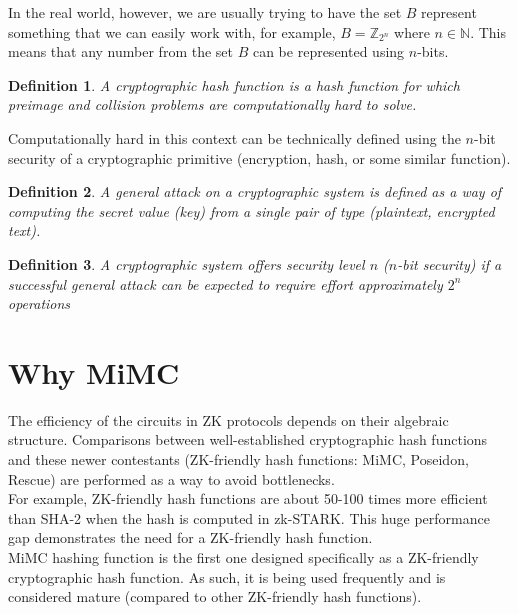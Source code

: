 \documentclass[letterpaper, bothsides, 12pt]{article} %
\newtheorem{definition}{Definition}
\begin{document}
In the real world, however, we are usually trying to have the set $B$ represent something that we can easily work with, for example, $B = \mathbb{Z}_{2^n}$ where $n \in \mathbb{N}$. This means that any number from the set $B$ can be represented using $n$-bits. \\

\begin{definition}
A cryptographic hash function is a hash function for which preimage and collision problems are computationally hard to solve.
\end{definition}

Computationally hard in this context can be technically defined using the $n$-bit security of a cryptographic primitive (encryption, hash, or some similar function).


\begin{definition}
A general attack on a cryptographic system is defined as a way of computing the secret value (key) from a single pair of type (plaintext, encrypted text). 
\end{definition}

\begin{definition}
A cryptographic system offers security level $n$ ($n$-bit security) if a successful general attack can be expected to require effort approximately $2^n$ operations \cite{Lenstra2010KeyLC}
\end{definition}


\section{Why MiMC}
The efficiency of the circuits in ZK protocols depends on their algebraic structure. Comparisons between well-established cryptographic hash functions and these newer contestants (ZK-friendly hash functions: MiMC, Poseidon, Rescue) are performed as a way to avoid bottlenecks. \\

For example, ZK-friendly hash functions are about 50-100 times more efficient than SHA-2 when the hash is computed in zk-STARK. This huge performance gap demonstrates the need for a ZK-friendly hash function. \\

MiMC hashing function \cite{zbMATH06679506} is the first one designed specifically as a ZK-friendly cryptographic hash function. As such, it is being used frequently and is considered mature (compared to other ZK-friendly hash functions). \\
\end{document}
